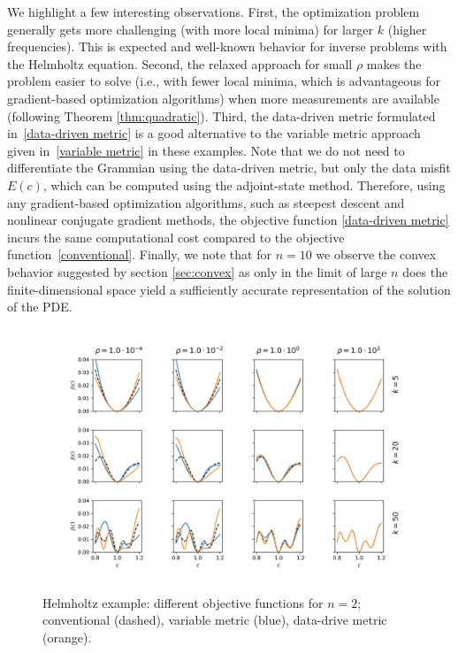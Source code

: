 \documentclass[12pt]{amsart}
\begin{document}
We highlight a few interesting observations. First, the optimization problem generally gets more challenging (with more local minima) for larger $k$ (higher frequencies). This is expected and well-known behavior for inverse problems with the Helmholtz equation. Second, the relaxed approach for small $\rho$ makes the problem easier to solve (i.e., with fewer local minima, which is advantageous for gradient-based optimization algorithms) when more measurements are available (following Theorem \ref{thm:quadratic}). Third, the data-driven metric formulated in~\eqref{data-driven metric} is a good alternative to the variable metric approach given in~\eqref{variable metric} in these examples. Note that we do not need to differentiate the Grammian using the data-driven metric, but only the data misfit $E(c)$, which can be computed using the adjoint-state method. Therefore, using any gradient-based optimization algorithms, such as steepest descent and nonlinear conjugate gradient methods, the objective function \eqref{data-driven metric} incurs the same computational cost compared to the objective function~\eqref{conventional}. %
Finally, we note that for $n=10$ we observe the convex behavior suggested by section \ref{sec:convex} as only in the limit of large $n$ does the finite-dimensional space yield a sufficiently accurate representation of the solution of the PDE.
\begin{figure}
\includegraphics[scale=.5]{figures/Helmholtz1D_2.png}
\caption{Helmholtz example: different objective functions for $n=2$; conventional (dashed), variable metric (blue), data-drive metric (orange).}\label{fig:helmholtz1da}
\end{figure}
\end{document}

